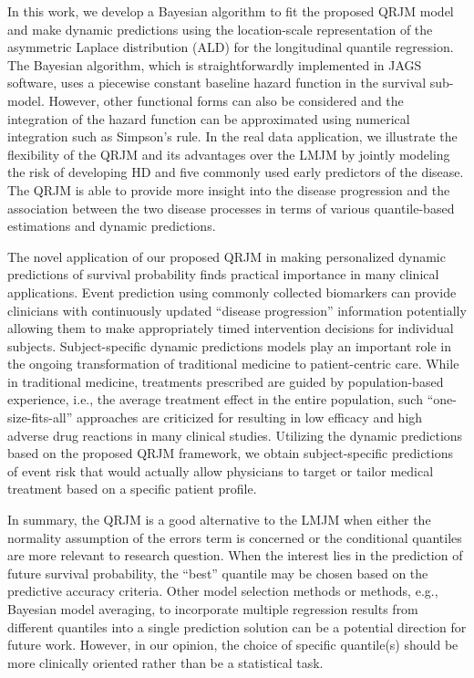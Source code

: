 In this work, we develop a Bayesian algorithm to fit the proposed QRJM model and make dynamic predictions using the location-scale representation of the asymmetric Laplace distribution (ALD) for the longitudinal quantile regression. The Bayesian algorithm, which is straightforwardly implemented in \textsf{JAGS} software, uses a piecewise constant baseline hazard function in the survival sub-model. However, other functional forms can also be considered and the integration of the hazard function can be approximated using numerical integration such as Simpson's rule. In the real data application, we illustrate the flexibility of the QRJM and its advantages over the LMJM by jointly modeling the risk of developing HD and five commonly used early predictors of the disease. The QRJM is able to provide more insight into the disease progression and the association between the two disease processes in terms of various quantile-based estimations and dynamic predictions.

The novel application of our proposed QRJM in making personalized dynamic predictions of survival probability finds practical importance in many clinical applications. Event prediction using commonly collected biomarkers can provide clinicians with continuously updated ``disease progression'' information potentially allowing them to make appropriately timed intervention decisions for individual subjects. Subject-specific dynamic predictions models play an important role in the ongoing transformation of traditional medicine to patient-centric care. While in traditional medicine, treatments prescribed are guided by population-based experience, i.e., the average treatment effect in the entire population, such ``one-size-fits-all'' approaches are criticized for resulting in low efficacy and high adverse drug reactions in many clinical studies. Utilizing the dynamic predictions based on the proposed QRJM framework, we obtain subject-specific predictions of event risk that would actually allow physicians to target or tailor medical treatment based on a specific patient profile.

In summary, the QRJM is a good alternative to the LMJM when either the normality assumption of the errors term is concerned or the conditional quantiles are more relevant to research question. When the interest lies in the prediction of future survival probability, the ``best'' quantile may be chosen based on the predictive accuracy criteria. Other model selection methods or methods, e.g., Bayesian model averaging, to incorporate multiple regression results from different quantiles into a single prediction solution can be a potential direction for future work. However, in our opinion, the choice of specific quantile(s) should be more clinically oriented rather than be a statistical task.



%
%
% 


% 
